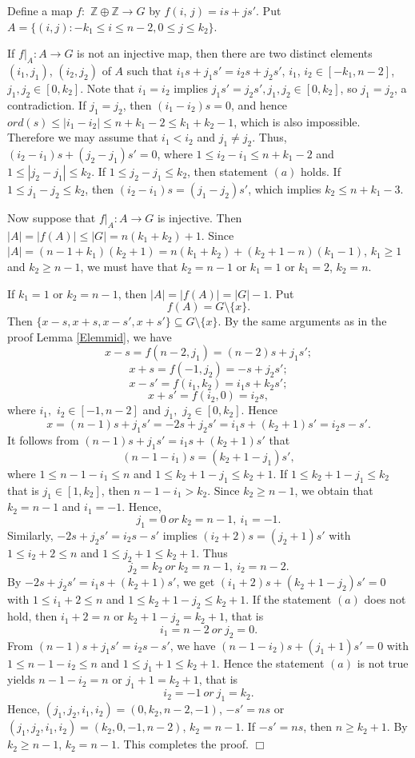 \documentclass[12pt]{article}
\newtheorem{open problem}{Open problem}[section]
\newenvironment{proof}{\trivlist
      \item[\hskip\labelsep
      {\itshape Proof.}]\normalfont}
      {\hspace*{\fill}$\Box$\endtrivlist}
\begin{document}
\begin{proof}
Define a map $f:$ $\mathbb{Z}\oplus \mathbb{Z}\rightarrow G$ by $f(i, \,j)=is+js'$.
Put $A=\{(i,j):-k_1\leq i\leq n-2,0\leq j\leq k_2\}$.

If $f|_A: A\rightarrow G$ is not an injective map,
then there are two distinct elements $(i_1,j_1)$, $(i_2,j_2)$ of $A$ such that
$i_1s+j_1s'=i_2s+j_2s'$,  $i_1$,  $i_2\in [-k_1,n-2]$, $j_1,  j_2\in [0,k_2]$. Note that $i_1=i_2$ implies $j_1s'=j_2s', j_1,  j_2\in [0,k_2]$, so $j_1=j_2$, a contradiction. If $j_1=j_2$, then $(i_1-i_2)s=0$, and hence $ord(s)\le |i_1-i_2|\le n+k_1-2\le k_1+k_2-1$, which is also impossible. Therefore we may assume  that $i_1<i_2$ and $j_1\neq j_2$. Thus, $(i_2-i_1)s+(j_2-j_1)s'=0$, where $1\leq i_2-i_1\leq n+k_1-2$ and $1\leq |j_2-j_1|\leq k_2$. If $1\leq j_2-j_1\leq k_2$, then statement $(a)$ holds. If $1\leq j_1-j_2\leq k_2$, then $(i_2-i_1)s=(j_1-j_2)s'$, which implies $k_2\leq n+k_1-3$.

Now suppose that $f|_A: A\rightarrow G$ is injective. Then $|A|=|f(A)|\leq |G|=n(k_1+k_2)+1$.
Since $|A|=(n-1+k_1)(k_2+1)=n(k_1+k_2)+(k_2+1-n)(k_1-1)$, $k_1\ge1$ and $k_2\ge n-1$, we must have that $k_2=n-1$ or $k_1=1$ or $k_1=2$, $k_2=n$.

If $k_1=1$ or $k_2=n-1$, then
 $|A|=|f(A)|=|G|-1$.
Put $$f(A)=G\setminus\{x\}.$$
Then $\{x-s,x+s,x-s',x+s'\}\subseteq G\setminus\{x\}$.
By the same arguments as in the proof Lemma \ref{Elemmid}, we have
$$x-s=f(n-2,j_1)=(n-2)s+j_1s';$$
$$x+s=f(-1,j_2)=-s+j_2s';$$
$$x-s'=f(i_1,k_2)=i_1s+k_2s';$$
$$x+s'=f(i_2,0)=i_2s,$$
where $i_1,$ $i_2\in [-1,n-2]$ and $j_1,$ $j_2\in [0,k_2]$. Hence
 $$x=(n-1)s+j_1s'=-2s+j_2s'=i_1s+(k_2+1)s'=i_2s-s'.$$
It follows from  $(n-1)s+j_1s'=i_1s+(k_2+1)s'$ that
$$(n-1-i_1)s=(k_2+1-j_1)s',$$
where $1\leq n-1-i_1\leq n$ and $1\leq k_2+1-j_1\leq k_2+1$.
If $1\leq k_2+1-j_1\leq k_2$ that is $j_1\in [1,k_2]$,
then $n-1-i_1>k_2$.
Since $k_2\geq n-1$, we obtain that $k_2=n-1$ and $i_1=-1$.
Hence,
$$j_1=0 \ or \ k_2=n-1, \ i_1=-1.$$
Similarly, $-2s+j_2s'=i_2s-s'$ implies $(i_2+2)s=(j_2+1)s'$
with $1\leq i_2+2\leq n$ and $1\leq j_2+1\leq k_2+1$.
Thus
$$j_2=k_2 \ or \ k_2=n-1, \ i_2=n-2.$$
By $-2s+j_2s'=i_1s+(k_2+1)s'$,
we get $(i_1+2)s+(k_2+1-j_2)s'=0$
with $1\leq i_1+2\leq n$ and $1\leq k_2+1-j_2\leq k_2+1$.
If the statement $(a)$ does not hold, then $i_1+2=n$ or $k_2+1-j_2=k_2+1$, that is
$$i_1=n-2 \ or \  j_2=0.$$
From $(n-1)s+j_1s'=i_2s-s'$, we have $(n-1-i_2)s+(j_1+1)s'=0$
with $1\leq n-1-i_2\leq n$ and $1\leq j_1+1\leq k_2+1$.
Hence the statement $(a)$ is not true yields $n-1-i_2=n$ or $j_1+1=k_2+1$, that is
$$i_2=-1 \ or \  j_1=k_2.$$
Hence, $(j_1,j_2,i_1,i_2)=(0,k_2,n-2,-1)$, $-s'=ns$ or $(j_1,j_2,i_1,i_2)=(k_2,0,-1,n-2)$, $k_2=n-1$.
If $-s'=ns$, then $n\geq k_2+1$.
By $k_2\geq n-1$, $k_2=n-1$.
This completes the proof.
\end{proof}
\end{document}
